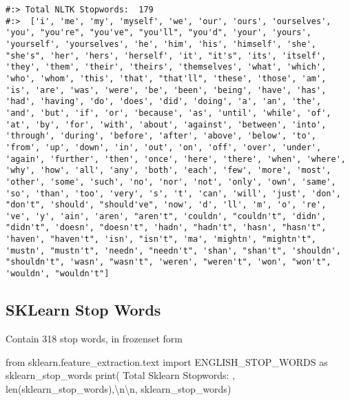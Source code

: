 \documentclass[
]{book}
\newenvironment{Shaded}{\begin{snugshade}}{\end{snugshade}}
\newcommand{\BuiltInTok}[1]{#1}
\newcommand{\CharTok}[1]{\textcolor[rgb]{0.5,0.5,0.5}{#1}}
\newcommand{\ImportTok}[1]{#1}
\newcommand{\NormalTok}[1]{#1}
\newcommand{\StringTok}[1]{\textcolor[rgb]{0.5,0.5,0.5}{#1}}
\begin{document}
\begin{verbatim}
#:> Total NLTK Stopwords:  179 
#:>  ['i', 'me', 'my', 'myself', 'we', 'our', 'ours', 'ourselves', 'you', "you're", "you've", "you'll", "you'd", 'your', 'yours', 'yourself', 'yourselves', 'he', 'him', 'his', 'himself', 'she', "she's", 'her', 'hers', 'herself', 'it', "it's", 'its', 'itself', 'they', 'them', 'their', 'theirs', 'themselves', 'what', 'which', 'who', 'whom', 'this', 'that', "that'll", 'these', 'those', 'am', 'is', 'are', 'was', 'were', 'be', 'been', 'being', 'have', 'has', 'had', 'having', 'do', 'does', 'did', 'doing', 'a', 'an', 'the', 'and', 'but', 'if', 'or', 'because', 'as', 'until', 'while', 'of', 'at', 'by', 'for', 'with', 'about', 'against', 'between', 'into', 'through', 'during', 'before', 'after', 'above', 'below', 'to', 'from', 'up', 'down', 'in', 'out', 'on', 'off', 'over', 'under', 'again', 'further', 'then', 'once', 'here', 'there', 'when', 'where', 'why', 'how', 'all', 'any', 'both', 'each', 'few', 'more', 'most', 'other', 'some', 'such', 'no', 'nor', 'not', 'only', 'own', 'same', 'so', 'than', 'too', 'very', 's', 't', 'can', 'will', 'just', 'don', "don't", 'should', "should've", 'now', 'd', 'll', 'm', 'o', 're', 've', 'y', 'ain', 'aren', "aren't", 'couldn', "couldn't", 'didn', "didn't", 'doesn', "doesn't", 'hadn', "hadn't", 'hasn', "hasn't", 'haven', "haven't", 'isn', "isn't", 'ma', 'mightn', "mightn't", 'mustn', "mustn't", 'needn', "needn't", 'shan', "shan't", 'shouldn', "shouldn't", 'wasn', "wasn't", 'weren', "weren't", 'won', "won't", 'wouldn', "wouldn't"]
\end{verbatim}

\hypertarget{sklearn-stop-words}{%
\subsection{SKLearn Stop Words}\label{sklearn-stop-words}}

Contain 318 stop words, in frozenset form

\begin{Shaded}
\begin{Highlighting}[]
\ImportTok{from}\NormalTok{ sklearn.feature\_extraction.text }\ImportTok{import}\NormalTok{ ENGLISH\_STOP\_WORDS }\ImportTok{as}\NormalTok{ sklearn\_stop\_words}
\BuiltInTok{print}\NormalTok{(}\StringTok{\textquotesingle{} Total Sklearn Stopwords: \textquotesingle{}}\NormalTok{, }\BuiltInTok{len}\NormalTok{(sklearn\_stop\_words),}\StringTok{\textquotesingle{}}\CharTok{\textbackslash{}n\textbackslash{}n}\StringTok{\textquotesingle{}}\NormalTok{,}
\NormalTok{       sklearn\_stop\_words)}
\end{Highlighting}
\end{Shaded}
\end{document}
